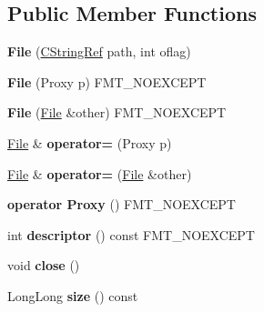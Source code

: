 \subsection*{Public Member Functions}
\begin{DoxyCompactItemize}
\item 
{\bfseries File} (\hyperlink{classfmt_1_1BasicCStringRef}{C\+String\+Ref} path, int oflag)\hypertarget{classfmt_1_1File_afe222b8f1728f1d803302aacba34ab0a}{}\label{classfmt_1_1File_afe222b8f1728f1d803302aacba34ab0a}

\item 
{\bfseries File} (Proxy p) F\+M\+T\+\_\+\+N\+O\+E\+X\+C\+E\+PT\hypertarget{classfmt_1_1File_af39ee41d0516e4410f935db49bc25a70}{}\label{classfmt_1_1File_af39ee41d0516e4410f935db49bc25a70}

\item 
{\bfseries File} (\hyperlink{classfmt_1_1File}{File} \&other) F\+M\+T\+\_\+\+N\+O\+E\+X\+C\+E\+PT\hypertarget{classfmt_1_1File_aa46430b90123d6ab616599c7da79baae}{}\label{classfmt_1_1File_aa46430b90123d6ab616599c7da79baae}

\item 
\hyperlink{classfmt_1_1File}{File} \& {\bfseries operator=} (Proxy p)\hypertarget{classfmt_1_1File_a49693f3a5e0cdb33e8db1e80f3bfb66d}{}\label{classfmt_1_1File_a49693f3a5e0cdb33e8db1e80f3bfb66d}

\item 
\hyperlink{classfmt_1_1File}{File} \& {\bfseries operator=} (\hyperlink{classfmt_1_1File}{File} \&other)\hypertarget{classfmt_1_1File_a0a5735314d74ec3769077e2ae1ce960a}{}\label{classfmt_1_1File_a0a5735314d74ec3769077e2ae1ce960a}

\item 
{\bfseries operator Proxy} () F\+M\+T\+\_\+\+N\+O\+E\+X\+C\+E\+PT\hypertarget{classfmt_1_1File_ab1523e72fde1f9080a4bae41dccfd824}{}\label{classfmt_1_1File_ab1523e72fde1f9080a4bae41dccfd824}

\item 
int {\bfseries descriptor} () const F\+M\+T\+\_\+\+N\+O\+E\+X\+C\+E\+PT\hypertarget{classfmt_1_1File_a19976004ecb9edfb762b5255736fe73c}{}\label{classfmt_1_1File_a19976004ecb9edfb762b5255736fe73c}

\item 
void {\bfseries close} ()\hypertarget{classfmt_1_1File_a0f9f9adfcae772efe2cae9c60a2f23f4}{}\label{classfmt_1_1File_a0f9f9adfcae772efe2cae9c60a2f23f4}

\item 
Long\+Long {\bfseries size} () const \hypertarget{classfmt_1_1File_aea68742f4f814c97d497a8a04dfc571e}{}\label{classfmt_1_1File_aea68742f4f814c97d497a8a04dfc571e}


\end{DoxyCompactItemize}
